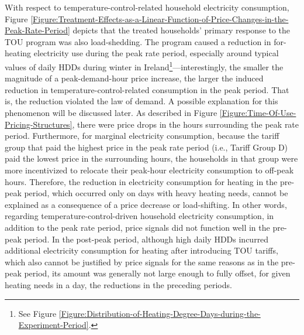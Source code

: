 With respect to temperature-control-related household electricity consumption, Figure \ref{Figure:Treatment-Effects-as-a-Linear-Function-of-Price-Changes-in-the-Peak-Rate-Period} depicts that the treated households' primary response to the TOU program was also load-shedding. The program caused a reduction in for-heating electricity use during the peak rate period, especially around typical values of daily HDDs during winter in Ireland\footnote{See Figure \ref{Figure:Distribution-of-Heating-Degree-Days-during-the-Experiment-Period}.}---interestingly, the smaller the magnitude of a peak-demand-hour price increase, the larger the induced reduction in temperature-control-related consumption in the peak period. That is, the reduction violated the law of demand. A possible explanation for this phenomenon will be discussed later. As described in Figure \ref{Figure:Time-Of-Use-Pricing-Structures}, there were price drops in the hours surrounding the peak rate period. Furthermore, for marginal electricity consumption, because the tariff group that paid the highest price in the peak rate period (i.e., Tariff Group D) paid the lowest price in the surrounding hours, the households in that group were more incentivized to relocate their peak-hour electricity consumption to off-peak hours. Therefore, the reduction in electricity consumption for heating in the pre-peak period, which occurred only on days with heavy heating needs, cannot be explained as a consequence of a price decrease or load-shifting. In other words, regarding temperature-control-driven household electricity consumption, in addition to the peak rate period, price signals did not function well in the pre-peak period. In the post-peak period, although high daily HDDs incurred additional electricity consumption for heating after introducing TOU tariffs, which also cannot be justified by price signals for the same reasons as in the pre-peak period, its amount was generally not large enough to fully offset, for given heating needs in a day, the reductions in the preceding periods.

